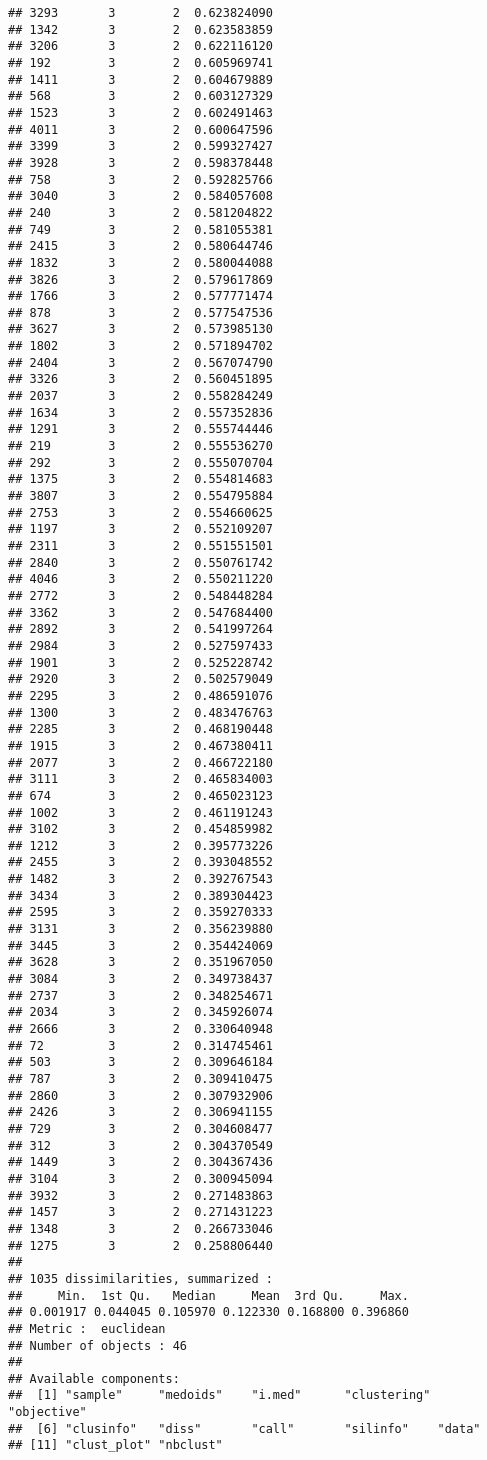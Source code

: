 \documentclass[
]{article}
\begin{document}
\begin{verbatim}
## 3293       3        2  0.623824090
## 1342       3        2  0.623583859
## 3206       3        2  0.622116120
## 192        3        2  0.605969741
## 1411       3        2  0.604679889
## 568        3        2  0.603127329
## 1523       3        2  0.602491463
## 4011       3        2  0.600647596
## 3399       3        2  0.599327427
## 3928       3        2  0.598378448
## 758        3        2  0.592825766
## 3040       3        2  0.584057608
## 240        3        2  0.581204822
## 749        3        2  0.581055381
## 2415       3        2  0.580644746
## 1832       3        2  0.580044088
## 3826       3        2  0.579617869
## 1766       3        2  0.577771474
## 878        3        2  0.577547536
## 3627       3        2  0.573985130
## 1802       3        2  0.571894702
## 2404       3        2  0.567074790
## 3326       3        2  0.560451895
## 2037       3        2  0.558284249
## 1634       3        2  0.557352836
## 1291       3        2  0.555744446
## 219        3        2  0.555536270
## 292        3        2  0.555070704
## 1375       3        2  0.554814683
## 3807       3        2  0.554795884
## 2753       3        2  0.554660625
## 1197       3        2  0.552109207
## 2311       3        2  0.551551501
## 2840       3        2  0.550761742
## 4046       3        2  0.550211220
## 2772       3        2  0.548448284
## 3362       3        2  0.547684400
## 2892       3        2  0.541997264
## 2984       3        2  0.527597433
## 1901       3        2  0.525228742
## 2920       3        2  0.502579049
## 2295       3        2  0.486591076
## 1300       3        2  0.483476763
## 2285       3        2  0.468190448
## 1915       3        2  0.467380411
## 2077       3        2  0.466722180
## 3111       3        2  0.465834003
## 674        3        2  0.465023123
## 1002       3        2  0.461191243
## 3102       3        2  0.454859982
## 1212       3        2  0.395773226
## 2455       3        2  0.393048552
## 1482       3        2  0.392767543
## 3434       3        2  0.389304423
## 2595       3        2  0.359270333
## 3131       3        2  0.356239880
## 3445       3        2  0.354424069
## 3628       3        2  0.351967050
## 3084       3        2  0.349738437
## 2737       3        2  0.348254671
## 2034       3        2  0.345926074
## 2666       3        2  0.330640948
## 72         3        2  0.314745461
## 503        3        2  0.309646184
## 787        3        2  0.309410475
## 2860       3        2  0.307932906
## 2426       3        2  0.306941155
## 729        3        2  0.304608477
## 312        3        2  0.304370549
## 1449       3        2  0.304367436
## 3104       3        2  0.300945094
## 3932       3        2  0.271483863
## 1457       3        2  0.271431223
## 1348       3        2  0.266733046
## 1275       3        2  0.258806440
## 
## 1035 dissimilarities, summarized :
##     Min.  1st Qu.   Median     Mean  3rd Qu.     Max. 
## 0.001917 0.044045 0.105970 0.122330 0.168800 0.396860 
## Metric :  euclidean 
## Number of objects : 46
## 
## Available components:
##  [1] "sample"     "medoids"    "i.med"      "clustering" "objective" 
##  [6] "clusinfo"   "diss"       "call"       "silinfo"    "data"      
## [11] "clust_plot" "nbclust"
\end{verbatim}
\end{document}
